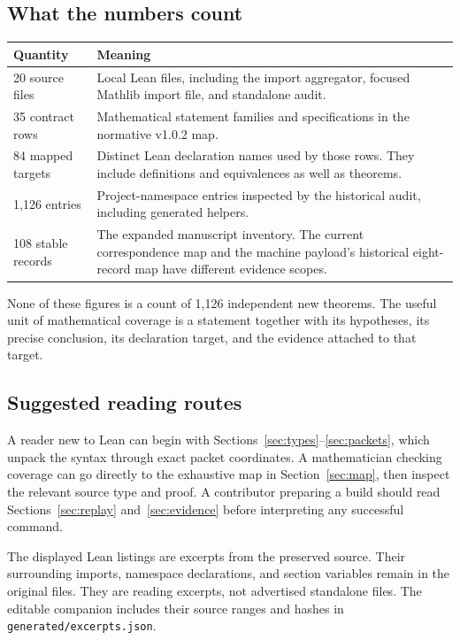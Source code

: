 \documentclass[11pt,a4paper]{article}
\newcommand{\code}[1]{\nolinkurl{#1}}
\begin{document}
\subsection{What the numbers count}

\begin{tabular}{p{}p{}}
\toprule Quantity & Meaning \\\midrule
20 source files & Local Lean files, including the import aggregator, focused Mathlib import file, and standalone audit. \\
35 contract rows & Mathematical statement families and specifications in the normative v1.0.2 map. \\
84 mapped targets & Distinct Lean declaration names used by those rows. They include definitions and equivalences as well as theorems. \\
1,126 entries & Project-namespace entries inspected by the historical audit, including generated helpers. \\
108 stable records & The expanded manuscript inventory. The current correspondence map and the machine payload's historical eight-record map have different evidence scopes. \\
\bottomrule
\end{tabular}

None of these figures is a count of 1,126 independent new theorems. The useful unit of mathematical coverage is a statement together with its hypotheses, its precise conclusion, its declaration target, and the evidence attached to that target.

\subsection{Suggested reading routes}

A reader new to Lean can begin with Sections~\ref{sec:types}--\ref{sec:packets}, which unpack the syntax through exact packet coordinates. A mathematician checking coverage can go directly to the exhaustive map in Section~\ref{sec:map}, then inspect the relevant source type and proof. A contributor preparing a build should read Sections~\ref{sec:replay} and~\ref{sec:evidence} before interpreting any successful command.

The displayed Lean listings are excerpts from the preserved source. Their surrounding imports, namespace declarations, and section variables remain in the original files. They are reading excerpts, not advertised standalone files. The editable companion includes their source ranges and hashes in \code{generated/excerpts.json}.
\end{document}
